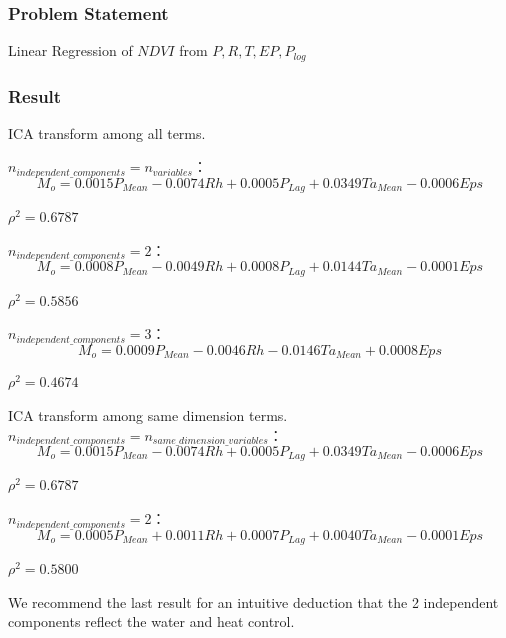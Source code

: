 \documentclass{beamer}
\begin{document}
\begin{frame}
\frametitle{Problem Statement}
Linear Regression of $NDVI$ from $P,R,T,EP,P_{log}$ 

\end{frame}

\begin{frame}
\frametitle{Result}
ICA transform among all terms.
 
$n_{independent\_components}=n_{variables}$：
\begin{equation*}
M_o=0.0015P_{Mean}-0.0074Rh+0.0005P_{Lag}+0.0349Ta_{Mean}-0.0006Eps
\end{equation*}
\begin{center}
$\rho^2=0.6787$ 
\end{center}

$n_{independent\_components}=2$：
\begin{equation*}
M_o=0.0008P_{Mean}-0.0049Rh+0.0008P_{Lag}+0.0144Ta_{Mean}-0.0001Eps
\end{equation*}
\begin{center}
$\rho^2=0.5856$
\end{center}

$n_{independent\_components}=3$：
\begin{equation*}
M_o=0.0009P_{Mean}-0.0046Rh -0.0146Ta_{Mean}+0.0008Eps
\end{equation*}
\begin{center}
$\rho^2=0.4674$
\end{center}
\end{frame}
\begin{frame}
ICA transform among same dimension terms.
$n_{independent\_components}=n_{same\_dimension\_variables}$：
\begin{equation*}
M_o=0.0015P_{Mean}-0.0074Rh+0.0005P_{Lag}+0.0349Ta_{Mean}-0.0006Eps
\end{equation*}
\begin{center}
$\rho^2=0.6787$ 
\end{center}

$n_{independent\_components}=2$： 
\begin{equation*}
M_o=0.0005P_{Mean}+0.0011Rh+0.0007P_{Lag}+0.0040Ta_{Mean}-0.0001Eps
\end{equation*}
\begin{center}
$\rho^2=0.5800$
\end{center}

We recommend the last result for an intuitive deduction that the 2 independent components reflect the water and heat control.
\end{frame}
\end{document}
